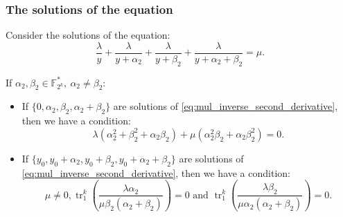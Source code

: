 \documentclass[
    aspectratio=169,                   %
]{beamer}
\newcommand{\Fks}{\mathbb{F}_{2^k}^*}
\newcommand{\tr}{\operatorname{tr}_1^k}
\begin{document}
    \begin{frame}
        \frametitle{The solutions of the equation}
        Consider the solutions of the equation: 
        \begin{equation}\tag{2}
            \frac{\lambda}{y}+\frac{\lambda}{y+\alpha_2}+\frac{\lambda}{y+\beta_2}+\frac{\lambda}{y+\alpha_2+\beta_2}=\mu.
        \end{equation}

        If $ \alpha_2,\beta_2\in\Fks,~\alpha_2\ne\beta_2 $: 
        \begin{itemize}
            \item If $ \{0,\alpha_2,\beta_2,\alpha_2+\beta_2\} $ are solutions of \eqref{eq:mul_inverse_second_derivative}, 
            then we have a condition: 
            \begin{equation}\label{condition:0_root_condition_1}
                \lambda(\alpha_2^2+\beta_2^2+\alpha_2\beta_2)+\mu(\alpha_2^2\beta_2+\alpha_2\beta_2^2)=0.
            \end{equation}
            \item If $ \{y_0,y_0+\alpha_2,y_0+\beta_2,y_0+\alpha_2+\beta_2\} $ 
            are solutions of \eqref{eq:mul_inverse_second_derivative}, then we have a condition: 
            \begin{equation}\label{condition:y_0_root_condition_2}
                \mu\ne 0, \tr\left(\frac{\lambda\alpha_2}{\mu\beta_2(\alpha_2+\beta_2)}\right)=0\text{~and~} 
                \tr\left(\frac{\lambda\beta_2}{\mu\alpha_2(\alpha_2+\beta_2)}\right)=0.
            \end{equation}
        \end{itemize}
    
    \end{frame}
\end{document}
